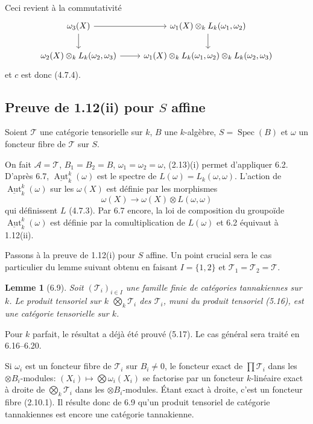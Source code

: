 \documentclass[12pt,a4paper]{article}
\theoremstyle{plain}
\newtheorem{lemma}[theorem]{Lemme}
\theoremstyle{definition}
\DeclareMathOperator{\Spec}{Spec}
\DeclareMathOperator{\Aut}{Aut}
\begin{document}
Ceci revient à la commutativité
\[
\begin{tikzcd}
\omega_3(X) \arrow[r] \arrow[d] & \omega_1(X) \otimes_k L_k(\omega_1, \omega_2) \arrow[d] \\
\omega_2(X) \otimes_k L_k(\omega_2, \omega_3) \arrow[r] & \omega_1(X) \otimes_k L_k(\omega_1, \omega_2) \otimes_k L_k(\omega_2, \omega_3)
\end{tikzcd}
\]
et $c$ est donc (4.7.4).

\subsection{Preuve de 1.12(ii) pour $S$ affine}

Soient $\mathcal{T}$ une catégorie tensorielle sur $k$, $B$ une $k$-algèbre, $S = \Spec(B)$ et $\omega$ un foncteur fibre de $\mathcal{T}$ sur $S$.

On fait $\mathcal{A} = \mathcal{T}$, $B_1 = B_2 = B$, $\omega_1 = \omega_2 = \omega$, (2.13)(i) permet d'appliquer 6.2. D'après 6.7, $\underline{\Aut}^k_k(\omega)$ est le spectre de $L(\omega) = L_k(\omega, \omega)$. L'action de $\underline{\Aut}^k_k(\omega)$ sur les $\omega(X)$ est définie par les morphismes
\[
\omega(X) \to \omega(X) \otimes L(\omega, \omega)
\]
qui définissent $L$ (4.7.3). Par 6.7 encore, la loi de composition du groupoïde $\underline{\Aut}^k_k(\omega)$ est définie par la comultiplication de $L(\omega)$ et 6.2 équivaut à 1.12(ii).

Passons à la preuve de 1.12(i) pour $S$ affine. Un point crucial sera le cas particulier du lemme suivant obtenu en faisant $I = \{1, 2\}$ et $\mathcal{T}_1 = \mathcal{T}_2 = \mathcal{T}$.

\begin{lemma}[6.9]
Soit $(\mathcal{T}_i)_{i \in I}$ une famille finie de catégories tannakiennes sur $k$. Le produit tensoriel sur $k$ $\bigotimes_k \mathcal{T}_i$ des $\mathcal{T}_i$, muni du produit tensoriel (5.16), est une catégorie tensorielle sur $k$.
\end{lemma}

Pour $k$ parfait, le résultat a déjà été prouvé (5.17). Le cas général sera traité en 6.16--6.20.

Si $\omega_i$ est un foncteur fibre de $\mathcal{T}_i$ sur $B_i \neq 0$, le foncteur exact de $\prod \mathcal{T}_i$ dans les $\otimes B_i$-modules: $(X_i) \mapsto \bigotimes \omega_i(X_i)$ se factorise par un foncteur $k$-linéaire exact à droite de $\bigotimes_k \mathcal{T}_i$ dans les $\otimes B_i$-modules. Étant exact à droite, c'est un foncteur fibre (2.10.1). Il résulte donc de 6.9 qu'un produit tensoriel de catégorie tannakiennes est encore une catégorie tannakienne.
\end{document}
